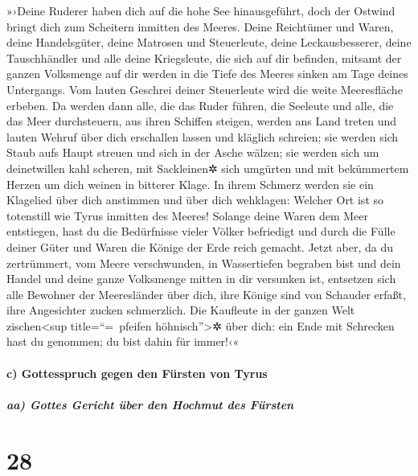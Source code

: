 »›Deine Ruderer haben dich auf die hohe See
hinausgeführt, doch der Ostwind bringt dich zum Scheitern inmitten des
Meeres. Deine Reichtümer und Waren, deine Handelsgüter,
deine Matrosen und Steuerleute, deine Leckausbesserer, deine
Tauschhändler und alle deine Kriegsleute, die sich auf dir befinden,
mitsamt der ganzen Volksmenge auf dir werden in die Tiefe des Meeres
sinken am Tage deines Untergangs. Vom lauten Geschrei
deiner Steuerleute wird die weite Meeresfläche erbeben.
Da werden dann alle, die das Ruder führen, die Seeleute
und alle, die das Meer durchsteuern, aus ihren Schiffen steigen, werden
ans Land treten und lauten Wehruf über dich erschallen
lassen und kläglich schreien; sie werden sich Staub aufs Haupt streuen
und sich in der Asche wälzen; sie werden sich um
deinetwillen kahl scheren, mit Sackleinen✲ sich umgürten und mit
bekümmertem Herzen um dich weinen in bitterer Klage. In
ihrem Schmerz werden sie ein Klagelied über dich anstimmen und über dich
wehklagen: Welcher Ort ist so totenstill wie Tyrus inmitten des Meeres!
Solange deine Waren dem Meer entstiegen, hast du die
Bedürfnisse vieler Völker befriedigt und durch die Fülle deiner Güter
und Waren die Könige der Erde reich gemacht. Jetzt aber,
da du zertrümmert, vom Meere verschwunden, in Wassertiefen begraben bist
und dein Handel und deine ganze Volksmenge mitten in dir versunken ist,
entsetzen sich alle Bewohner der Meeresländer über dich,
ihre Könige sind von Schauder erfaßt, ihre Angesichter zucken
schmerzlich. Die Kaufleute in der ganzen Welt
zischen\textless sup title=``=~pfeifen höhnisch''\textgreater✲ über
dich: ein Ende mit Schrecken hast du genommen; du bist dahin für
immer!‹«

\hypertarget{c-gottesspruch-gegen-den-fuxfcrsten-von-tyrus}{%
\paragraph{c) Gottesspruch gegen den Fürsten von
Tyrus}\label{c-gottesspruch-gegen-den-fuxfcrsten-von-tyrus}}

\hypertarget{aa-gottes-gericht-uxfcber-den-hochmut-des-fuxfcrsten}{%
\subparagraph{aa) Gottes Gericht über den Hochmut des
Fürsten}\label{aa-gottes-gericht-uxfcber-den-hochmut-des-fuxfcrsten}}

\hypertarget{section-27}{%
\section{28}\label{section-27}}

